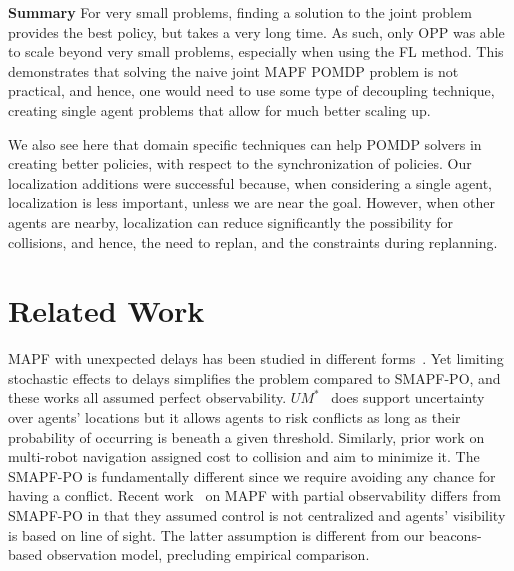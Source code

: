 \documentclass[letterpaper]{article} %
\begin{document}
\noindent\textbf{Summary} For very small problems, finding a solution to the joint problem provides the best policy, but takes a very long time. As such, only OPP was able to scale beyond very small problems, especially when using the FL method. This demonstrates that solving the naive joint MAPF POMDP problem is not practical, and hence, one would need to use some type of decoupling technique, creating single agent problems that allow for much better scaling up.

We also see here that domain specific techniques can help POMDP solvers in creating better policies, with respect to the synchronization of policies. Our localization additions were successful because, when considering a single agent, localization is less important, unless we are near the goal. However, when other agents are nearby, localization can reduce significantly the possibility for collisions, and hence, the need to replan, and the constraints during replanning.




\section{Related Work}

MAPF with unexpected delays has been studied in different forms~\cite{atzmon2020probabilistic,shahar2021safe,atzmon2020robust,ma2017multiAgent}. Yet limiting stochastic effects to delays simplifies the problem compared to SMAPF-PO, and these works all assumed perfect observability.
$UM^*$~\cite{wagner2017path} does support uncertainty over agents' locations but it allows agents to risk conflicts as long as their probability of occurring is beneath a given threshold. Similarly, prior work on multi-robot navigation assigned cost to collision and aim to minimize it.
The SMAPF-PO is fundamentally different since we require avoiding any chance for having a conflict. %
Recent work~\cite{davydov2021q} on MAPF with partial observability differs from SMAPF-PO in that they assumed control is not centralized and agents' visibility is based on line of sight. The latter assumption is different from our beacons-based observation model, precluding empirical comparison.
\end{document}
